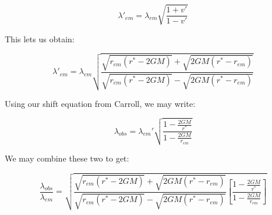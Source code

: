 \begin{enumerate}
\begin{enumerate}
        $$\lambda'_{em}=\lambda_{em}\sqrt{\frac{1+v'}{1-v'}}$$

        This lets us obtain:

        $$\lambda'_{em}=\lambda_{em}\sqrt{\frac{\sqrt{r_{em}(r^{*}-2GM)}+\sqrt{2GM(r^{*}-r_{em})}}{\sqrt{r_{em}(r^{*}-2GM)}-\sqrt{2GM(r^{*}-r_{em})}}}$$

        Using our shift equation from Carroll, we may write:

        $$\lambda_{obs}=\lambda_{em}'\sqrt{\frac{1-\frac{2GM}{r^{*}}}{1-\frac{2GM}{r_{em}}}}$$

        We may combine these two to get:

        $$\boxed{\frac{\lambda_{obs}}{\lambda_{em}}=\sqrt{\frac{\sqrt{r_{em}(r^{*}-2GM)}+\sqrt{2GM(r^{*}-r_{em})}}{\sqrt{r_{em}(r^{*}-2GM)}-\sqrt{2GM(r^{*}-r_{em})}}\left[\frac{1-\frac{2GM}{r^{*}}}{1-\frac{2GM}{r_{em}}}\right]}}$$

    \end{enumerate}

\end{enumerate}



